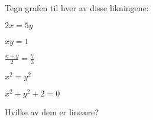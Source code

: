 
\begin{oppgave}
Tegn grafen til hver av disse likningene:
\begin{punkt}
$2x = 5y$
\end{punkt}
\begin{punkt}
$xy = 1$
\end{punkt}
\begin{punkt}
$\frac{x+y}{2} = \frac{7}{3}$
\end{punkt}
\begin{punkt}
$x^2 = y^2$
\end{punkt}
\begin{punkt}
$x^2 + y^2 + 2 = 0$
\end{punkt}
\medskip\noindent
Hvilke av dem er lineære?
\end{oppgave}

